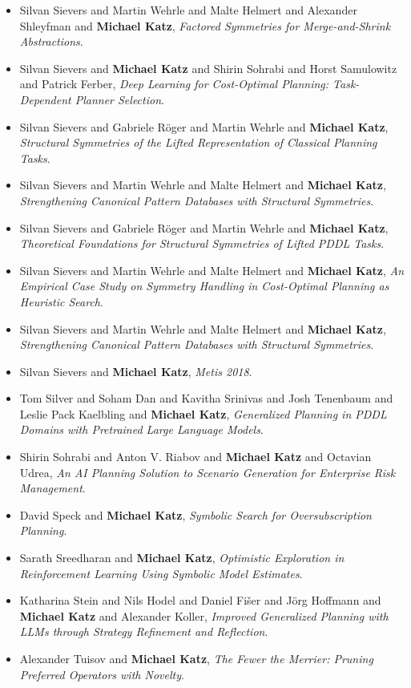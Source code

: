 \begin{itemize}[noitemsep]
\item Silvan Sievers and Martin Wehrle and Malte Helmert and Alexander Shleyfman and {\bf Michael Katz}, {\it Factored Symmetries for Merge-and-Shrink Abstractions}.
\item Silvan Sievers and {\bf Michael Katz} and Shirin Sohrabi and Horst Samulowitz and Patrick Ferber, {\it Deep Learning for Cost-Optimal Planning: Task-Dependent Planner Selection}.
\item Silvan Sievers and Gabriele Röger and Martin Wehrle and {\bf Michael Katz}, {\it Structural Symmetries of the Lifted Representation of Classical Planning Tasks}.
\item Silvan Sievers and Martin Wehrle and Malte Helmert and {\bf Michael Katz}, {\it Strengthening Canonical Pattern Databases with Structural Symmetries}.
\item Silvan Sievers and Gabriele Röger and Martin Wehrle and {\bf Michael Katz}, {\it Theoretical Foundations for Structural Symmetries of Lifted PDDL Tasks}.
\item Silvan Sievers and Martin Wehrle and Malte Helmert and {\bf Michael Katz}, {\it An Empirical Case Study on Symmetry Handling in Cost-Optimal Planning as Heuristic Search}.
\item Silvan Sievers and Martin Wehrle and Malte Helmert and {\bf Michael Katz}, {\it Strengthening Canonical Pattern Databases with Structural Symmetries}.
\item Silvan Sievers and {\bf Michael Katz}, {\it Metis 2018}.
\item Tom Silver and Soham Dan and Kavitha Srinivas and Josh Tenenbaum and Leslie Pack Kaelbling and {\bf Michael Katz}, {\it Generalized Planning in PDDL Domains with Pretrained Large Language Models}.
\item Shirin Sohrabi and Anton V. Riabov and {\bf Michael Katz} and Octavian Udrea, {\it An AI Planning Solution to Scenario Generation for Enterprise Risk Management}.
\item David Speck and {\bf Michael Katz}, {\it Symbolic Search for Oversubscription Planning}.
\item Sarath Sreedharan and {\bf Michael Katz}, {\it Optimistic Exploration in Reinforcement Learning Using Symbolic Model Estimates}.
\item Katharina Stein and Nils Hodel and Daniel Fišer and Jörg Hoffmann and {\bf Michael Katz} and Alexander Koller, {\it Improved Generalized Planning with LLMs through Strategy Refinement and Reflection}.
\item Alexander Tuisov and {\bf Michael Katz}, {\it The Fewer the Merrier: Pruning Preferred Operators with Novelty}.

\end{itemize}
